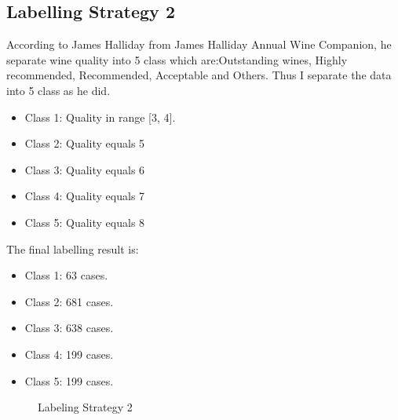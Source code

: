 \documentclass[titlepage,a4paper,12pt,thmsb]{report}
\begin{document}
\newpage

\subsection{Labelling Strategy 2}

According to James Halliday from James Halliday Annual Wine Companion, he separate wine quality into 5 class which are:Outstanding wines, Highly recommended, Recommended, Acceptable and Others. Thus I separate the data into 5 class as he did.
\begin{itemize}
\item{Class 1:  Quality in range [3, 4].}
\item{Class 2:  Quality equals 5}
\item{Class 3:  Quality equals 6}
\item{Class 4:  Quality equals 7}
\item{Class 5:  Quality equals 8}
\end{itemize}

The final labelling result is:

\begin{itemize}
\item{Class 1: 63 cases.}
\item{Class 2: 681 cases.}
\item{Class 3: 638 cases.}
\item{Class 4: 199 cases.}
\item{Class 5: 199 cases.}
\end{itemize}

\begin{center}
\begin{figure}[hbtp]
{\par}
\caption{ Labeling Strategy 2}
\end{figure}
{}
\end{center}
\end{document}
